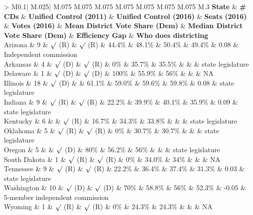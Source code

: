         \begin{table}[!htbp]
        \caption{Information about Twelve States with Constitutional Provisions similar to Pennsylvania}
        \label{tab:states_compare}
        \begin{tabular}{
        >{\centering\arraybackslash}
        M{0.1\linewidth}|
        M{.025\linewidth}|
        M{.075\linewidth}
        M{.075\linewidth}
        M{.075\linewidth}
        M{.075\linewidth}
        M{.075\linewidth}
        M{.075\linewidth}
        M{.075\linewidth}
        M{.3\linewidth}}
        \textbf{State} & \textbf{\# CDs} & \textbf{Unified Control (2011)} & \textbf{Unified Control (2016)} & \textbf{Seats (2016)} & \textbf{Votes (2016)} & \textbf{Mean District Vote Share (Dem)} & \textbf{Median District Vote Share (Dem)} & \textbf{Efficiency Gap} & \textbf{Who does districting} \\
         \hline
        Arizona & 9 & $\surd$ (R) & $\surd$ (R) & 44.4\% & 48.1\% & 50.4\% & 49.4\% & 0.08 & Independent commission \\
        Arkansas & 4 & $\surd$ (D) & $\surd$ (R) & 0\% & 35.7\% & 35.5\% &  &  & state legislature \\
        Delaware & 1 & $\surd$ (D) & $\surd$ (D) & 100\% & 55.9\% & 56\% &  &  & NA \\
        Illinois & 18 & $\surd$ (D) &  & 61.1\% & 59.0\% & 59.6\% & 59.8\% & 0.08 & state legislature \\
        Indiana & 9 & $\surd$ (R) & $\surd$ (R) & 22.2\% & 39.9\% & 40.1\% & 35.9\% & 0.09 & state legislature \\
        Kentucky & 6 &  & $\surd$ (R) & 16.7\% & 34.3\% & 33.8\% &  &  & state legislature \\
        Oklahoma & 5 & $\surd$ (R) & $\surd$ (R) & 0\% & 30.7\% & 30.7\% &  &  & state legislature \\
        Oregon & 5 &  & $\surd$ (D) & 80\% & 56.2\% & 56\% &  &  & state legislature \\
        South Dakota & 1 & $\surd$ (R) & $\surd$ (R) & 0\% & 34.0\% & 34\% &  &  & NA \\
        Tennessee & 9 & $\surd$ (R) & $\surd$ (R) & 22.2\% & 36.4\% & 37.4\% & 31.3\% & 0.03 & state legislature \\
        Washington & 10 & $\surd$ (D) & $\surd$ (D) & 70\% & 58.8\% & 56\% & 52.3\% & -0.05 & 5-member independent commission \\
        Wyoming & 1 & $\surd$ (R) & $\surd$ (R) & 0\% & 24.3\% & 24.3\% &  &  & NA  


\end{tabular}
\end{table}
